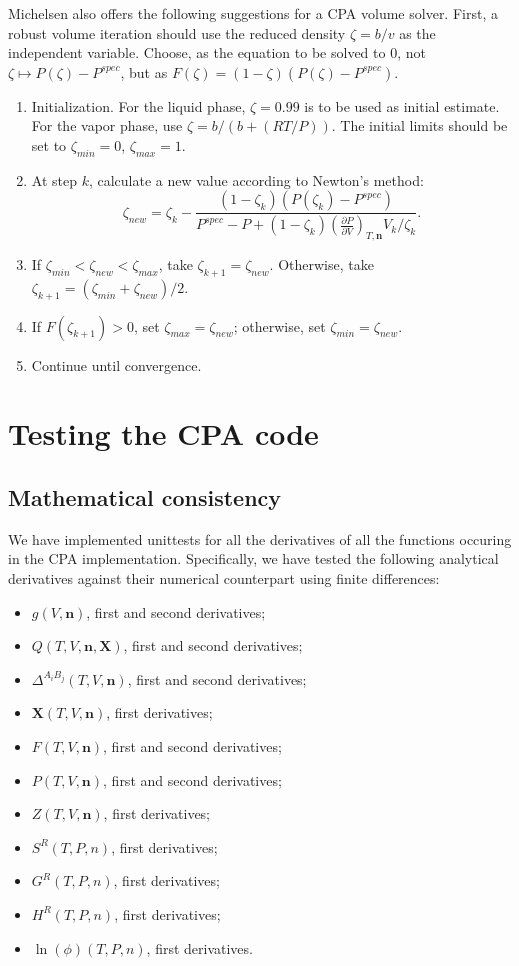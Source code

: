 \documentclass[english]{../thermomemo/thermomemo}
\newcommand{\mbf}[0]{\mathbf}
\newcommand*{\pder}[2]{\left(\frac{\partial #1}{\partial #2}\right)}
\newcommand{\z}{\zeta}
\begin{document}
Michelsen also offers the following suggestions for a CPA volume solver. First, a robust volume iteration should use the reduced density $\zeta = b/v$ as the independent variable. Choose, as the equation to be solved to $0$, not $\zeta \mapsto P(\zeta) - P^{spec}$, but as $F(\z) = (1-\z)(P(\zeta) - P^{spec})$. 
\begin{enumerate}
\item Initialization. For the liquid phase, $\zeta = 0.99$ is to be used as initial estimate. For the vapor phase, use $\zeta = b/(b+(RT/P))$. The initial limits should be set to $\z_{min} = 0$, $\z_{max} = 1$.
\item At step $k$, calculate a new value according to Newton's method:
  \begin{equation}
    \z_{new} = \z_k - \frac{(1-\z_k)(P(\z_k) - P^{spec})}{P^{spec} - P + (1-\z_k)\pder{P}{V}_{T,\mbf n}V_k/\zeta_k}.
  \end{equation}
\item If $\z_{min} < \z_{new} < \z_{max}$, take $\z_{k+1} = \z_{new}$. Otherwise, take $\z_{k+1} = (\z_{min} + \z_{new})/2$.
\item If $F(\z_{k+1}) > 0$, set $\z_{max} = \z_{new}$; otherwise, set $\z_{min} = \z_{new}$.
\item Continue until convergence.
\end{enumerate}

\section{Testing the CPA code}
\subsection{Mathematical consistency}
We have implemented unittests for all the derivatives of all the functions occuring in the CPA implementation. Specifically, we have tested the following analytical derivatives against their numerical counterpart using finite differences:
\begin{itemize}
  \item \(g(V,\mbf n)\), first and second derivatives;
  \item \(Q(T,V,\mbf n, \mbf X)\), first and second derivatives;
  \item \(\Delta^{A_i B_j}(T,V,\mbf n)\), first and second derivatives;
  \item \(\mbf X(T,V,\mbf n)\), first derivatives;
  \item \(F(T,V,\mbf n)\), first and second derivatives;
  \item \(P(T,V,\mbf n)\), first and second derivatives;
  \item \(Z(T,V,\mbf n)\), first derivatives;
  \item \(S^R(T,P,n)\), first derivatives;
  \item \(G^R(T,P,n)\), first derivatives;
  \item \(H^R(T,P,n)\), first derivatives;
  \item \(\ln(\phi)(T,P,n)\), first derivatives.
\end{itemize}
\end{document}
